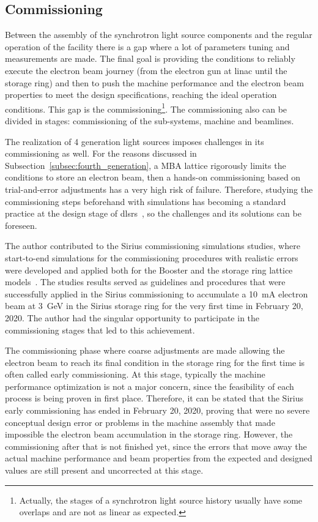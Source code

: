 \subsection{Commissioning}
Between the assembly of the synchrotron light source components and the regular operation of the facility there is a gap where a lot of parameters tuning and measurements are made. The final goal is providing the conditions to reliably execute the electron beam journey (from the electron gun at \gls{linac} until the storage ring) and then to push the machine performance and the electron beam properties to meet the design specifications, reaching the ideal operation conditions. This gap is the commissioning\footnote{Actually, the stages of a synchrotron light source history usually have some overlaps and are not as linear as expected.}. The commissioning also can be divided in stages: commissioning of the sub-systems, machine and beamlines.

The realization of 4 generation light sources imposes challenges in its commissioning as well. For the reasons discussed in Subsection~\ref{subsec:fourth_generation}, a MBA lattice rigorously limits the conditions to store an electron beam, then a hands-on commissioning based on trial-and-error adjustments has a very high risk of failure. Therefore, studying the commissioning steps beforehand with simulations has becoming a standard practice at the design stage of \glspl{dlsr}~\cite{sajaev2015, liuzzo2017, ghasem2019, sajaev2019, hellert2019}, so the challenges and its solutions can be foreseen. 

The author contributed to the Sirius commissioning simulations studies, where start-to-end simulations for the commissioning procedures with realistic errors were developed and applied both for the Booster and the storage ring lattice models~\cite{alves2019}. The studies results served as guidelines and procedures that were successfully applied in the Sirius commissioning to accumulate a \SI{10}{\milli\ampere} electron beam at \SI{3}{\giga\electronvolt} in the Sirius storage ring for the very first time in February 20, 2020. The author had the singular opportunity to participate in the commissioning stages that led to this achievement.

The commissioning phase where coarse adjustments are made allowing the electron beam to reach its final condition in the storage ring for the first time is often called early commissioning. At this stage, typically the machine performance optimization is not a major concern, since the feasibility of each process is being proven in first place. Therefore, it can be stated that the Sirius early commissioning has ended in February 20, 2020, proving that were no severe conceptual design error or problems in the machine assembly that made impossible the electron beam accumulation in the storage ring. However, the commissioning after that is not finished yet, since the errors that move away the actual machine performance and beam properties from the expected and designed values are still present and uncorrected at this stage.

